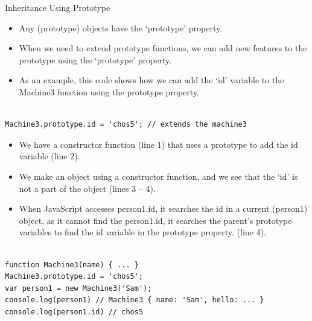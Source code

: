 \begin{frame}[fragile]{Inheritance Using Prototype}

\begin{itemize}
	\item Any (prototype) objects have the `prototype' property. 
	\item When we need to extend prototype functions, we can add new features to the prototype using the `prototype' property. 
	\item As an example, this code shows how we can add the `id' variable to the Machine3 function using the prototype property. 
\end{itemize}

\begin{Code}{}%
\begin{lstlisting}[firstnumber=1, label=glabels, xleftmargin=0pt, basicstyle=\scriptsize]% 

Machine3.prototype.id = 'chos5'; // extends the machine3 
\end{lstlisting}%
\end{Code}%
\end{frame}

\begin{frame}[fragile]{}

\begin{itemize}
	\item We have a constructor function (line 1) that uses a prototype to add the id variable (line 2).  
	\item  We make an object using a constructor function, and we see that the `id' is not a part of the object (lines 3 -- 4).
	\item When JavaScript accesses person1.id, it searches the id in a current (person1) object, as it cannot find the person1.id,  it searches the parent's prototype variables to find the id variable in the prototype property. (line 4).
\end{itemize}

\begin{Code}{}%
\begin{lstlisting}[firstnumber=1, label=glabels, xleftmargin=0pt, basicstyle=\scriptsize]% 

function Machine3(name) { ... }
Machine3.prototype.id = 'chos5';
var person1 = new Machine3('Sam');
console.log(person1) // Machine3 { name: 'Sam', hello: ... }
console.log(person1.id) // chos5
\end{lstlisting}%
\end{Code}%

\end{frame}

